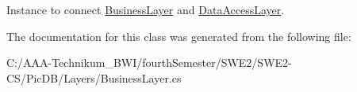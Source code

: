 Instance to connect \mbox{\hyperlink{class_pic_d_b_1_1_layers_1_1_business_layer}{Business\+Layer}} and \mbox{\hyperlink{class_pic_d_b_1_1_layers_1_1_data_access_layer}{Data\+Access\+Layer}}. 



The documentation for this class was generated from the following file\+:\begin{DoxyCompactItemize}
\item 
C\+:/\+A\+A\+A-\/\+Technikum\+\_\+\+B\+W\+I/fourth\+Semester/\+S\+W\+E2/\+S\+W\+E2-\/\+C\+S/\+Pic\+D\+B/\+Layers/Business\+Layer.\+cs\end{DoxyCompactItemize}
